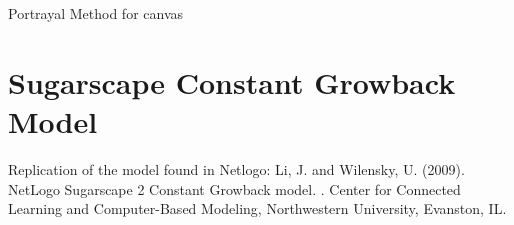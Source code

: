 \documentclass[letterpaper,10pt,english]{sphinxmanual}
\begin{document}

\begin{fulllineitems}
\label{\detokenize{index:examples.schelling.server.schelling_draw}}
Portrayal Method for canvas

\end{fulllineitems}

\label{\detokenize{index:module-examples.sugarscape_cg.sugarscape_cg.model}}

\chapter{Sugarscape Constant Growback Model}
\label{\detokenize{index:sugarscape-constant-growback-model}}
Replication of the model found in Netlogo:
Li, J. and Wilensky, U. (2009). NetLogo Sugarscape 2 Constant Growback model.
.
Center for Connected Learning and Computer-Based Modeling,
Northwestern University, Evanston, IL.
\end{document}

